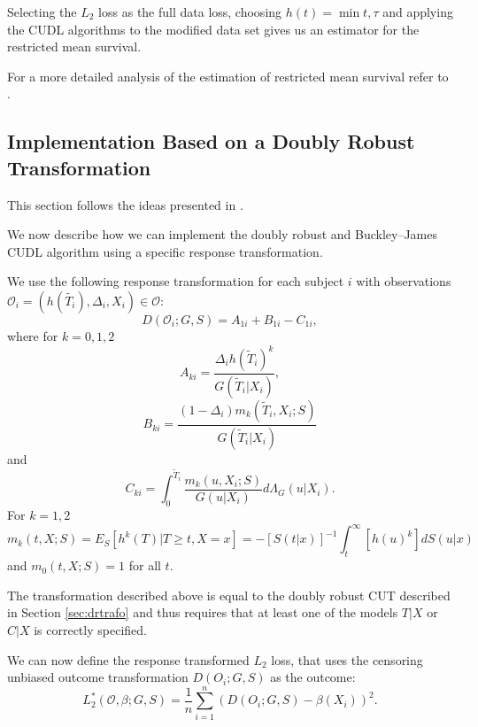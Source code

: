 \documentclass[12pt, a4paper]{scrartcl}
\theoremstyle{definition}
\theoremstyle{plain}
\numberwithin{equation}{section}
\numberwithin{figure}{section}
\numberwithin{table}{section}
\begin{document}
	Selecting the $L_2$ loss as the full data loss, choosing $h(t) = \min{t,\tau}$ and applying the CUDL algorithms to the modified data set gives us an estimator for the restricted mean survival.
	
	For a more detailed analysis of the estimation of restricted mean survival refer to \citet*{strawderman}. 
	
	\subsection{Implementation Based on a Doubly Robust Transformation}\label{trafo}

	This section follows the ideas presented in \citet*{basearticle}.
	
	We now describe how we can implement the doubly robust and Buckley--James CUDL algorithm using a specific response transformation.
	
		
	We use the following response transformation for each subject $i$ with observations $\mathcal{O}_i = (h(\tilde{T_i}), \Delta_i, X_i) \in \mathcal{O}$:
	\begin{equation*}
	D(\mathcal O_i; G,S) = A_{1i}+B_{1i} - C_{1i},
	\end{equation*}
	where for $k=0,1,2$
	\begin{equation*}
	A_{ki} = \frac{\Delta_i h(\tilde{T}_i)^k}{G(\tilde{T}_i\vert X_i)},
	\end{equation*}
	\begin{equation*}
	B_{ki} = \frac{(1-\Delta_i)m_k(\tilde{T}_i, X_i; S)}{G(\tilde{T}_i\vert X_i)}
	\end{equation*}
	and
	\begin{equation*}
	C_{ki} = \int_{0}^{\tilde{T}_i} \frac{m_k(u, X_i; S)}{G(u \vert X_i)}d\Lambda_G(u \vert X_i).
	\end{equation*}
	For $k=1,2$
	\begin{equation}\label{eq:condexp}
	m_k(t,X;S) = E_S[h^k(T) \vert T \geq t, X = x] = -[S(t\vert x)]^{-1} \int_{t}^{\infty}[h(u)^k]dS(u\vert x)
	\end{equation}
	and $m_0(t,X;S) = 1$ for all $t$.
	
	The transformation described above is equal to the doubly robust CUT described in Section \ref{sec:drtrafo} and thus requires that at least one of the models $T\vert X$ or $C \vert X$ is correctly specified.
	
	We can now define the response transformed $L_2$ loss, that uses the censoring unbiased outcome transformation $D(O_i;G,S)$ as the outcome:
	\begin{equation*}
	L_2^*(\mathcal{O}, \beta; G,S) = \frac{1}{n} \sum_{i=1}^n (D(O_i;G,S)-\beta(X_i))^2.
	\end{equation*}
	
\end{document}
